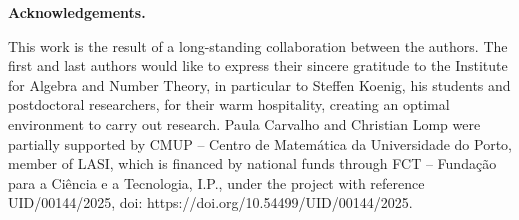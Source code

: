 \documentclass[oneside, a4paper, 11pt]{amsart}
\begin{document}
\bigskip

{\bf Acknowledgements.}

This work is the result of a long-standing collaboration between the
authors. The first and last authors would like to express their sincere
gratitude to the Institute for Algebra and Number Theory, in particular to
Steffen Koenig, his students and postdoctoral researchers, for their warm
hospitality, creating an optimal environment to carry out research.
Paula Carvalho and Christian Lomp were partially supported by CMUP – Centro
de Matem\'{a}tica da Universidade do Porto, member of LASI, which is financed by
national funds through FCT – Funda\c{c}\~{a}o para a
Ci\^encia e a Tecnologia, I.P.,
under the project with reference UID/00144/2025, doi:
https://doi.org/10.54499/UID/00144/2025.

\bigskip
\end{document}
